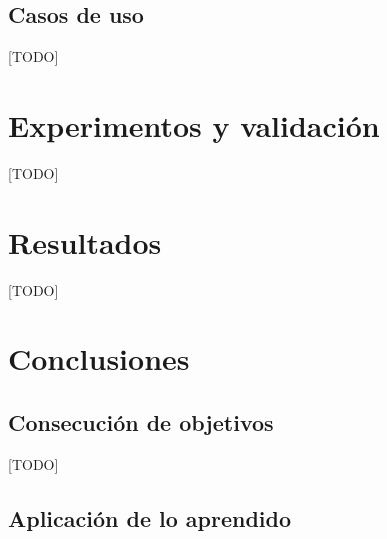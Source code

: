 \documentclass[a4paper, 12pt]{book}
\begin{document}
\section{Casos de uso} 
\label{sec:use_cases}
[TODO]




\cleardoublepage
\chapter{Experimentos y validación}

[TODO]



\cleardoublepage
\chapter{Resultados}

[TODO]



\cleardoublepage
\chapter{Conclusiones}
\label{chap:conclusiones}


\section{Consecución de objetivos}
\label{sec:consecucion-objetivos}

[TODO]

\section{Aplicación de lo aprendido}
\label{sec:aplicacion}
\end{document}
